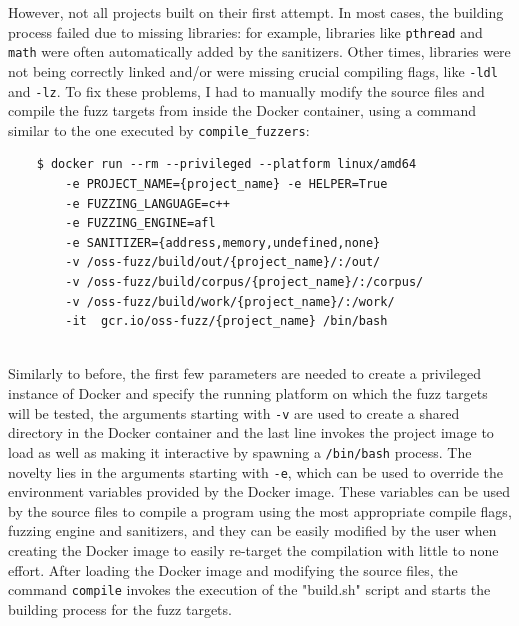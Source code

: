 \newpage
However, not all projects built on their first attempt.
\newline \newline
In most cases, the building process failed due to missing libraries: for example, libraries like \verb|pthread| and \verb|math| were often automatically added by the sanitizers.
\newline
Other times, libraries were not being correctly linked and/or were missing crucial compiling flags, like \verb|-ldl| and \verb|-lz|.
\newline \newline
To fix these problems, I had to manually modify the source files and compile the fuzz targets from inside the Docker container, using a command similar to the one executed by \verb|compile_fuzzers|:
\begin{verbatim}
    $ docker run --rm --privileged --platform linux/amd64 
        -e PROJECT_NAME={project_name} -e HELPER=True 
        -e FUZZING_LANGUAGE=c++ 
        -e FUZZING_ENGINE=afl 
        -e SANITIZER={address,memory,undefined,none} 
        -v /oss-fuzz/build/out/{project_name}/:/out/
        -v /oss-fuzz/build/corpus/{project_name}/:/corpus/    
        -v /oss-fuzz/build/work/{project_name}/:/work/
        -it  gcr.io/oss-fuzz/{project_name} /bin/bash
\end{verbatim}
\ \\
Similarly to before, the first few parameters are needed to create a privileged instance of Docker and specify the running platform on which the fuzz targets will be tested, the arguments starting with \verb|-v| are used to create a shared directory in the Docker container and the last line invokes the project image to load as well as making it interactive by spawning a \verb|/bin/bash| process.
\newline \newline
The novelty lies in the arguments starting with \verb|-e|, which can be used to override the environment variables provided by the Docker image.
\newline
These variables can be used by the source files to compile a program using the most appropriate compile flags, fuzzing engine and sanitizers, and they can be easily modified by the user when creating the Docker image to easily re-target the compilation with little to none effort.
\newline \newline
After loading the Docker image and modifying the source files, the command \verb|compile| invokes the execution of the "build.sh" script and starts the building process for the fuzz targets.



